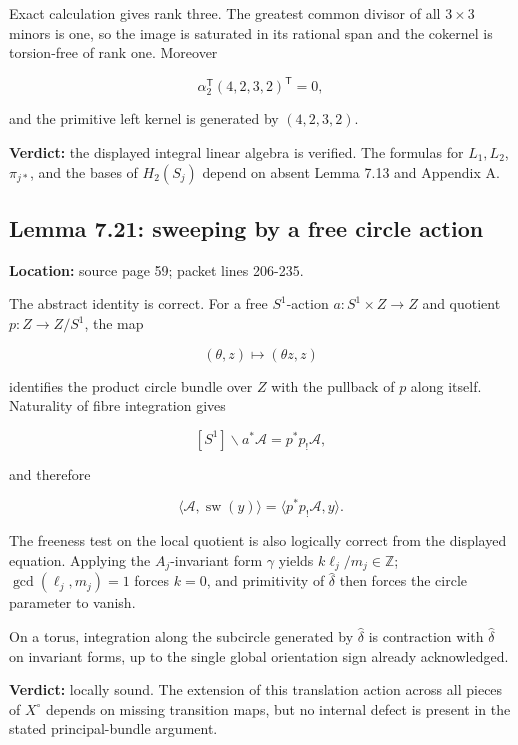 \documentclass[
  10pt,
]{article}
\begin{document}
Exact calculation gives rank three. The greatest common divisor of all
\(3\times3\) minors is one, so the image is saturated in its rational
span and the cokernel is torsion-free of rank one. Moreover

\[
\alpha_2^{\mathsf T}(4,2,3,2)^{\mathsf T}=0,
\]

and the primitive left kernel is generated by \((4,2,3,2)\).

\textbf{Verdict:} the displayed integral linear algebra is verified. The
formulas for \(L_1,L_2\), \(\pi_{j*}\), and the bases of \(H_2(S_j)\)
depend on absent Lemma 7.13 and Appendix A.

\subsection{Lemma 7.21: sweeping by a free circle
action}\label{lemma-7.21-sweeping-by-a-free-circle-action}

\textbf{Location:} source page 59; packet lines 206-235.

The abstract identity is correct. For a free \(S^1\)-action
\(a:S^1\times Z\to Z\) and quotient \(p:Z\to Z/S^1\), the map

\[
(\theta,z)\longmapsto(\theta z,z)
\]

identifies the product circle bundle over \(Z\) with the pullback of
\(p\) along itself. Naturality of fibre integration gives

\[
[S^1]\backslash a^*\mathcal A=p^*p_!\mathcal A,
\]

and therefore

\[
\langle\mathcal A,\operatorname{sw}(y)\rangle
 =\langle p^*p_!\mathcal A,y\rangle.
\]

The freeness test on the local quotient is also logically correct from
the displayed equation. Applying the \(A_j\)-invariant form \(\gamma\)
yields \(k\ell_j/m_j\in\mathbb Z\); \(\gcd(\ell_j,m_j)=1\) forces
\(k=0\), and primitivity of \(\widehat\delta\) then forces the circle
parameter to vanish.

On a torus, integration along the subcircle generated by
\(\widehat\delta\) is contraction with \(\widehat\delta\) on invariant
forms, up to the single global orientation sign already acknowledged.

\textbf{Verdict:} locally sound. The extension of this translation
action across all pieces of \(X^\circ\) depends on missing transition
maps, but no internal defect is present in the stated principal-bundle
argument.
\end{document}
